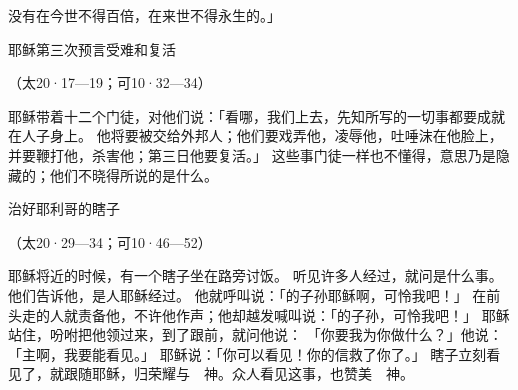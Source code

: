 {没有在今世不得百倍，在来世不得永生的。」
\par }{\SH 耶稣第三次预言受难和复活
\par }{\R （太20·17—19；可10·32—34）
\par }{\PP {}耶稣带着十二个门徒，对他们说：「看哪，我们上{}去，先知所写的一切事都要成就在人子身上。
他将要被交给外邦人；他们要戏弄他，凌辱他，吐唾沫在他脸上，
并要鞭打他，杀害他；第三日他要复活。」
这些事门徒一样也不懂得，意思乃是隐藏的；他们不晓得所说的是什么。
\par }{\SH 治好耶利哥的瞎子
\par }{\R （太20·29—34；可10·46—52）
\par }{\PP {}耶稣将近{}的时候，有一个瞎子坐在路旁讨饭。
听见许多人经过，就问是什么事。
他们告诉他，是{}人耶稣经过。
他就呼叫说：「{}的子孙耶稣啊，可怜我吧！」
在前头走的人就责备他，不许他作声；他却越发喊叫说：「{}的子孙，可怜我吧！」
耶稣站住，吩咐把他领过来，到了跟前，就问他说：
「你要我为你做什么？」他说：「主啊，我要能看见。」
耶稣说：「你可以看见！你的信救了你了。」
瞎子立刻看见了，就跟随耶稣，{}归荣耀与　神。众人看见这事，也赞美　神。

}
